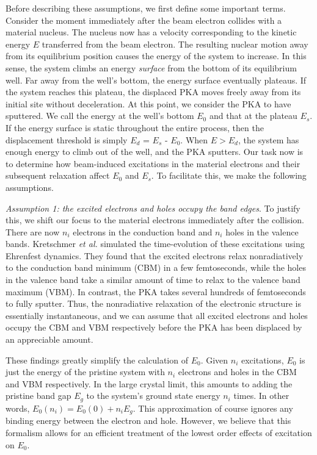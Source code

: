 \documentclass[twoside,twocolumn,9pt]{article}
\begin{document}
Before describing these assumptions, we first define some important terms.
Consider the moment immediately after the beam electron collides with a
material nucleus.
The nucleus now has a velocity corresponding to the kinetic energy
$E$ transferred from the beam electron.
The resulting nuclear motion away from its equilibrium position causes the
energy of the system to increase.
In this sense, the system climbs an energy \textit{surface} from the bottom of its
equilibrium well.
Far away from the well's bottom, the energy surface eventually plateaus.
If the system reaches this plateau, the displaced PKA moves
freely away from its initial site without deceleration. At this point, we
consider the PKA to have sputtered. We call the energy at the well's bottom
$E_0$ and that at the plateau $E_s$.
If the energy surface is static throughout the entire process, then the
displacement threshold is simply $E_d$ = $E_s$ - $E_0$.
When $E>E_d$, the system has enough energy to climb out of the well,
and the PKA sputters.  Our task now is to determine how beam-induced
excitations in the material electrons and their subsequent relaxation affect
$E_0$ and $E_s$.  To facilitate this, we make the following assumptions.

\medskip\noindent
\textit{Assumption 1: the excited electrons and holes occupy the band edges}.
To justify this, we shift our focus to the material electrons immediately after
the collision.  There are now $n_i$ electrons in the conduction band and $n_i$
holes in the valence bands.  Kretschmer \textit{et al.} simulated the time-evolution of
these excitations using Ehrenfest dynamics.\cite{Kretschmer2020,Li2005}
They found that the excited electrons relax nonradiatively to the conduction
band minimum (CBM) in a few femtoseconds, while the holes in the valence band
take a similar amount of time to relax to the valence band maximum (VBM).
In contrast, the PKA takes several hundreds of femtoseconds to fully sputter.
\cite{Yoshimura2018}
Thus, the nonradiative relaxation of the electronic structure is essentially
instantaneous, and we can assume that all excited electrons and holes occupy
the CBM and VBM respectively before the PKA has been displaced by an
appreciable amount.

These findings greatly simplify the calculation of $E_0$.
Given $n_i$ excitations, $E_0$ is just the energy of the pristine system with
$n_i$ electrons and holes in the CBM and VBM respectively.
In the large crystal limit, this amounts to adding the pristine band gap $E_g$
to the system's ground state energy $n_i$ times.
In other words, $E_0(n_i) = E_0(0) + n_iE_g$.
This approximation of course ignores any binding energy between the electron
and hole.
However, we believe that this formalism allows for an efficient treatment of
the lowest order effects of excitation on $E_0$.
\end{document}
